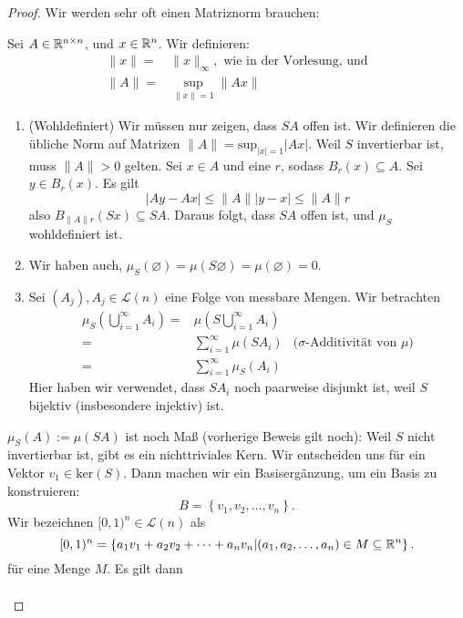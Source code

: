 \begin{proof}
	Wir werden sehr oft einen Matriznorm brauchen:
	\begin{tcolorbox}[title=Matriz $\infty$-Norm]
		Sei  $A\in \mathbb{R}^{n\times n}$, und $x\in \mathbb{R}^n$. Wir definieren:
		\begin{align*}
			\|x\|=&\|x\|_{\infty},\text{ wie in der Vorlesung, und}\\
			\|A\|=&\sup_{\|x\|=1}\|Ax\|
		\end{align*}
	\end{tcolorbox}
\begin{parts}
\item 
	\begin{enumerate}[label=(\roman*)]
		\item (Wohldefiniert) Wir müssen nur zeigen, dass $SA$ offen ist. Wir definieren die übliche Norm auf Matrizen $\|A\|=\text{sup}_{|x|=1}|Ax|$. Weil $S$ invertierbar ist, muss $\|A\|>0$ gelten. Sei $x\in A$ und eine $r$, sodass $B_r(x)\subseteq A$. Sei $y\in B_r(x)$. Es gilt
			\[
			|Ay-Ax|\le \|A\| |y-x|\le \|A\|r
		\]
		also $B_{\|A\|r}(Sx)\subseteq SA$. Daraus folgt, dass $SA$ offen ist, und $\mu_S$ wohldefiniert ist.
	\item Wir haben auch, $\mu_S(\varnothing)=\mu(S\varnothing)=\mu(\varnothing)=0$.
	\item Sei  $(A_j), A_j\in \mathcal{L}(n)$ eine Folge von messbare Mengen. Wir betrachten
		\begin{align*}
			\mu_S\left(\bigcup_{i=1} ^\infty A_i\right)=&\mu\left( S\bigcup_{i=1}^\infty A_i\right) \\
			=& \sum_{i=1}^{\infty} \mu(SA_i) &(\sigma\text{-Additivität von $\mu$)}\\
			=&  \sum_{i=1}^{\infty} \mu_S(A_i)
		\end{align*}
		Hier haben wir verwendet, dass $SA_i$ noch paarweise disjunkt ist, weil $S$ bijektiv (insbesondere injektiv) ist.
	\end{enumerate}
\item $\mu_S(A):=\mu(SA)$ ist noch Maß (vorherige Beweis gilt noch): Weil $S$ nicht invertierbar ist, gibt es ein nichttriviales Kern. Wir entscheiden uns f\"{u}r ein Vektor $v_1\in \text{ker}(S)$. Dann machen wir ein Basisergänzung, um ein Basis zu konstruieren:
	\[
	B=\left\{ v_1,v_2,\dots, v_n \right\} 
	.\] 
	Wir bezeichnen $[0,1)^n\in \mathcal{L}(n)$ als
	\[
	[0,1)^n=\left\{ a_1v_1+a_2v_2+\dots+a_nv_n|(a_1,a_2,\dots,a_n)\in M\subseteq \mathbb{R}^n \right\} 
	.\] 
	f\"{u}r eine Menge $M$. Es gilt dann
	\begin{align*}

\end{align*}
\end{parts}
\end{proof}

